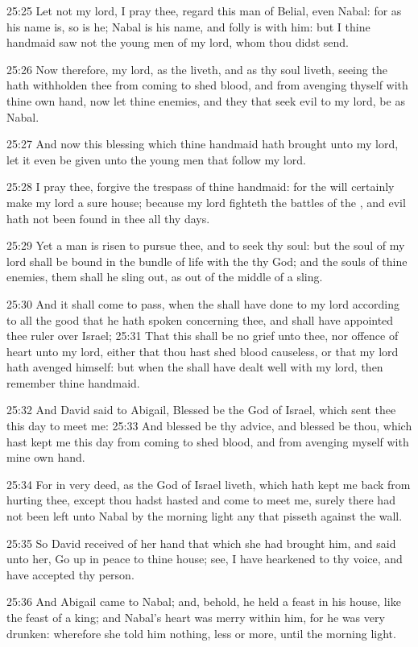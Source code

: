 25:25 Let not my lord, I pray thee, regard this man of Belial, even
Nabal: for as his name is, so is he; Nabal is his name, and folly is
with him: but I thine handmaid saw not the young men of my lord, whom
thou didst send.

25:26 Now therefore, my lord, as the \LORD liveth, and as thy soul
liveth, seeing the \LORD hath withholden thee from coming to shed
blood, and from avenging thyself with thine own hand, now let thine
enemies, and they that seek evil to my lord, be as Nabal.

25:27 And now this blessing which thine handmaid hath brought unto my
lord, let it even be given unto the young men that follow my lord.

25:28 I pray thee, forgive the trespass of thine handmaid: for the
\LORD will certainly make my lord a sure house; because my lord
fighteth the battles of the \LORD, and evil hath not been found in thee
all thy days.

25:29 Yet a man is risen to pursue thee, and to seek thy soul: but the
soul of my lord shall be bound in the bundle of life with the \LORD thy
God; and the souls of thine enemies, them shall he sling out, as out
of the middle of a sling.

25:30 And it shall come to pass, when the \LORD shall have done to my
lord according to all the good that he hath spoken concerning thee,
and shall have appointed thee ruler over Israel; 25:31 That this shall
be no grief unto thee, nor offence of heart unto my lord, either that
thou hast shed blood causeless, or that my lord hath avenged himself:
but when the \LORD shall have dealt well with my lord, then remember
thine handmaid.

25:32 And David said to Abigail, Blessed be the \LORD God of Israel,
which sent thee this day to meet me: 25:33 And blessed be thy advice,
and blessed be thou, which hast kept me this day from coming to shed
blood, and from avenging myself with mine own hand.

25:34 For in very deed, as the \LORD God of Israel liveth, which hath
kept me back from hurting thee, except thou hadst hasted and come to
meet me, surely there had not been left unto Nabal by the morning
light any that pisseth against the wall.

25:35 So David received of her hand that which she had brought him,
and said unto her, Go up in peace to thine house; see, I have
hearkened to thy voice, and have accepted thy person.

25:36 And Abigail came to Nabal; and, behold, he held a feast in his
house, like the feast of a king; and Nabal's heart was merry within
him, for he was very drunken: wherefore she told him nothing, less or
more, until the morning light.

